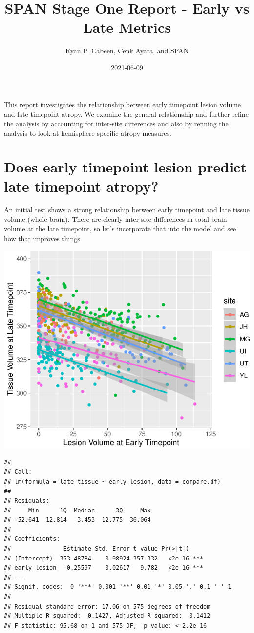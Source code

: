 \documentclass[
]{article}
\title{SPAN Stage One Report - Early vs Late Metrics}
\author{Ryan P. Cabeen, Cenk Ayata, and SPAN}
\date{2021-06-09}
\begin{document}
\maketitle

This report investigates the relationship between early timepoint lesion
volume and late timepoint atropy. We examine the general relationship
and further refine the analysis by accounting for inter-site differences
and also by refining the analysis to look at hemisphere-specific atropy
measures.

\newpage

\hypertarget{does-early-timepoint-lesion-predict-late-timepoint-atropy}{%
\section{Does early timepoint lesion predict late timepoint
atropy?}\label{does-early-timepoint-lesion-predict-late-timepoint-atropy}}

An initial test shows a strong relationship between early timepoint and
late tissue volume (whole brain). There are clearly inter-site
differences in total brain volume at the late timepoint, so let's
incorporate that into the model and see how that improves things.

\begin{center}\includegraphics{paper_files/figure-latex/plot_raw-1} \end{center}

\begin{verbatim}
## 
## Call:
## lm(formula = late_tissue ~ early_lesion, data = compare.df)
## 
## Residuals:
##     Min      1Q  Median      3Q     Max 
## -52.641 -12.814   3.453  12.775  36.064 
## 
## Coefficients:
##               Estimate Std. Error t value Pr(>|t|)    
## (Intercept)  353.48784    0.98924 357.332   <2e-16 ***
## early_lesion  -0.25597    0.02617  -9.782   <2e-16 ***
## ---
## Signif. codes:  0 '***' 0.001 '**' 0.01 '*' 0.05 '.' 0.1 ' ' 1
## 
## Residual standard error: 17.06 on 575 degrees of freedom
## Multiple R-squared:  0.1427, Adjusted R-squared:  0.1412 
## F-statistic: 95.68 on 1 and 575 DF,  p-value: < 2.2e-16
\end{verbatim}
\end{document}
